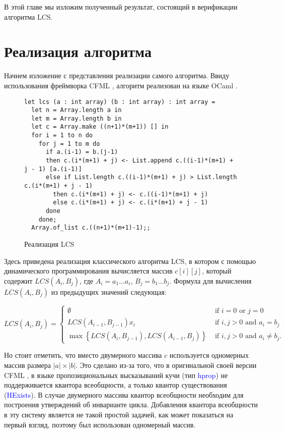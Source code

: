 В этой главе мы изложим полученный результат, состоящий в верификации алгоритма LCS.
\section{Реализация алгоритма}
Начнем изложение с представления реализации самого алгоритма. Ввиду использования фреймворка CFML \cite{CFML},
алгоритм реализован на языке OCaml \cite{ocaml}.

\begin{figure}[H]
  \caption{Реализация LCS}
  \label{code:lcs_impl}
  \begin{verbatim}
let lcs (a : int array) (b : int array) : int array =
  let n = Array.length a in
  let m = Array.length b in
  let c = Array.make ((n+1)*(m+1)) [] in
  for i = 1 to n do
    for j = 1 to m do
      if a.(i-1) = b.(j-1)
      then c.(i*(m+1) + j) <- List.append c.((i-1)*(m+1) + j - 1) [a.(i-1)]
      else if List.length c.((i-1)*(m+1) + j) > List.length c.(i*(m+1) + j - 1)
        then c.(i*(m+1) + j) <- c.((i-1)*(m+1) + j)
        else c.(i*(m+1) + j) <- c.(i*(m+1) + j - 1)
      done
    done; 
  Array.of_list c.((n+1)*(m+1)-1);;
\end{verbatim}
\end{figure}

Здесь приведена реализация классического алгоритма LCS, в котором с помощью динамического программирования вычисляется массив
$c[i][j]$, который содержит $LCS(A_i, B_j)$, где $A_i = a_1 \ldots a_i$, $B_j = b_1 \ldots b_j$.
Формула для вычисления $LCS(A_i, B_j)$ из предыдущих значений следующая:

$$
  L C S\left(A_{i}, B_{j}\right)=\left\{\begin{array}{ll}
    \emptyset                                                                              & \text { if } i=0 \text { or } j=0                    \\
    L C S\left(A_{i-1}, B_{j-1}\right) x_{i}                                               & \text { if } i, j>0 \text { and } a_{i}=b_{j}        \\
    \max \left\{L C S\left(A_{i}, B_{j-1}\right), L C S\left(A_{i-1}, B_{j}\right)\right\} & \text { if } i, j>0 \text { and } a_{i} \neq b_{j} .
  \end{array}\right.
$$

Но стоит отметить, что вместо двумерного массива $c$ используется одномерных массив размера $|a| \times |b|$. Это сделано из-за того,
что в оригинальной своей версии CFML \cite{CFML}, в языке пропозициональных высказываний кучи (тип \textcolor{blue}{hprop})
не поддерживается квантора всеобщности, а только квантор существования (\textcolor{blue}{HExists}). В случае двумерного массива
квантор всеобщности необходим для построения утверждений об инварианте цикла.
Добавления квантора всеобщности в эту систему является не такой простой задачей, как может показаться на первый взгляд, поэтому
был использован одномерный массив.

